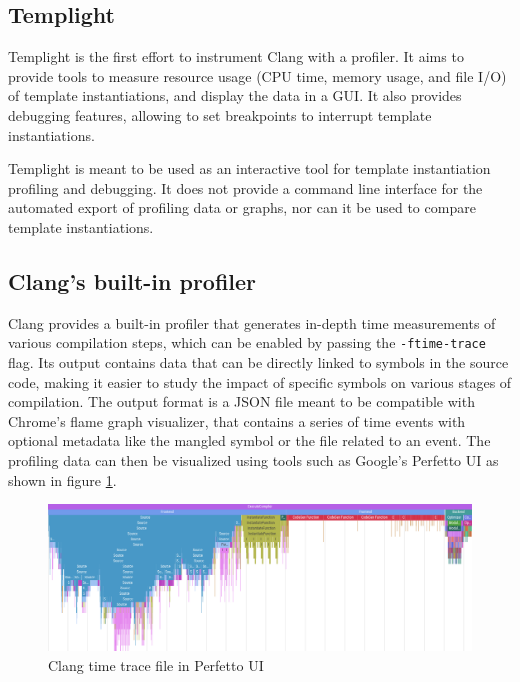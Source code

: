 \documentclass[../main]{subfiles}
\begin{document}
\subsection{
  Templight
}

Templight \cite{templight} is the first effort to instrument Clang with a
profiler. It aims to provide tools to measure resource usage (CPU time,
memory usage, and file I/O) of template instantiations, and display the
data in a GUI. It also provides debugging features, allowing to set breakpoints
to interrupt template instantiations.

Templight is meant to be used as an interactive tool for template instantiation
profiling and debugging. It does not provide a command line interface for the
automated export of profiling data or graphs, nor can it be used to compare
template instantiations.

\subsection{
  Clang's built-in profiler
}

Clang provides a built-in profiler \cite{time-trace} that generates
in-depth time measurements of various compilation steps, which can be enabled by
passing the \lstinline{-ftime-trace} flag. Its output contains data that can be
directly linked to symbols in the source code, making it easier to study the
impact of specific symbols on various stages of compilation. The output format
is a JSON file meant to be compatible with Chrome's flame graph visualizer, that
contains a series of time events with optional metadata like the mangled \cpp
symbol or the file related to an event. The profiling data can then be
visualized using tools such as Google's Perfetto UI as shown in figure
\ref{fig:perfetto-time-trace-ui}.

\begin{figure}[h]
\includegraphics[scale=0.4, angle=90]{images/perfetto-ui.png}
\caption{Clang time trace file in Perfetto UI}
\label{fig:perfetto-time-trace-ui}
\clearpage
\end{figure}
\end{document}
